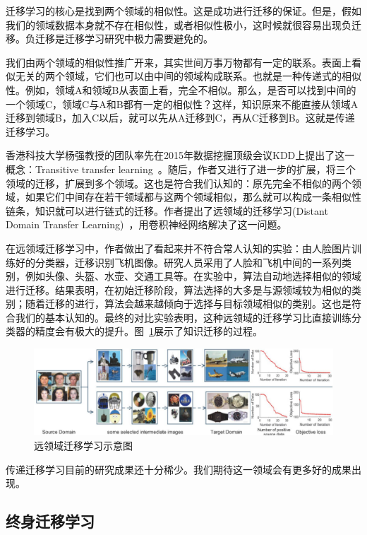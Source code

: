 迁移学习的核心是找到两个领域的相似性。这是成功进行迁移的保证。但是，假如我们的领域数据本身就不存在相似性，或者相似性极小，这时候就很容易出现负迁移。负迁移是迁移学习研究中极力需要避免的。

我们由两个领域的相似性推广开来，其实世间万事万物都有一定的联系。表面上看似无关的两个领域，它们也可以由中间的领域构成联系。也就是一种传递式的相似性。例如，领域A和领域B从表面上看，完全不相似。那么，是否可以找到中间的一个领域C，领域C与A和B都有一定的相似性？这样，知识原来不能直接从领域A迁移到领域B，加入C以后，就可以先从A迁移到C，再从C迁移到B。这就是传递迁移学习。

香港科技大学杨强教授的团队率先在2015年数据挖掘顶级会议KDD上提出了这一概念：Transitive transfer learning~\cite{tan2015transitive}。随后，作者又进行了进一步的扩展，将三个领域的迁移，扩展到多个领域。这也是符合我们认知的：原先完全不相似的两个领域，如果它们中间存在若干领域都与这两个领域相似，那么就可以构成一条相似性链条，知识就可以进行链式的迁移。作者提出了远领域的迁移学习(Distant Domain Transfer Learning)~\cite{tan2017distant}，用卷积神经网络解决了这一问题。

在远领域迁移学习中，作者做出了看起来并不符合常人认知的实验：由人脸图片训练好的分类器，迁移识别飞机图像。研究人员采用了人脸和飞机中间的一系列类别，例如头像、头盔、水壶、交通工具等。在实验中，算法自动地选择相似的领域进行迁移。结果表明，在初始迁移阶段，算法选择的大多是与源领域较为相似的类别；随着迁移的进行，算法会越来越倾向于选择与目标领域相似的类别。这也是符合我们的基本认知的。最终的对比实验表明，这种远领域的迁移学习比直接训练分类器的精度会有极大的提升。图~\ref{fig-future-ddtl}展示了知识迁移的过程。

\begin{figure}[htbp]
	\centering
	\includegraphics[scale=0.35]{./figures/fig-future-ddtl.pdf}
	\caption{远领域迁移学习示意图}
	\label{fig-future-ddtl}
\end{figure}

传递迁移学习目前的研究成果还十分稀少。我们期待这一领域会有更多好的成果出现。

\subsection{终身迁移学习}

